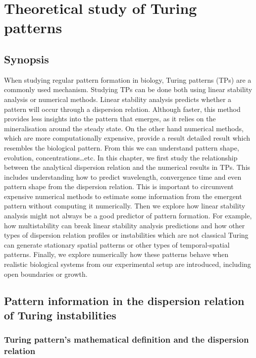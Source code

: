 \chapter{Theoretical study of Turing patterns }
\section{Synopsis}
When studying regular pattern formation in biology, Turing patterns (TPs) are a commonly used mechanism.
Studying TPs can be done both using linear stability analysis or numerical methods.
Linear stability analysis predicts whether a pattern will occur through a dispersion relation.
Although faster, this method provides less insights into the pattern that emerges, as it relies on the mineralisation around the steady state.
On the other hand numerical methods, which are more computationally expensive, provide a result detailed result which resembles the biological pattern. From this we can understand pattern shape, evolution, concentrations\ldots etc.
In this chapter, we first study the relationship between the analytical dispersion relation and the numerical results in TPs.
This includes understanding how to predict wavelength,
convergence time and even pattern shape from the dispersion relation.
This is important to circumvent expensive numerical methods to estimate some information from the emergent pattern without computing it numerically.
Then we explore how linear stability analysis might not always be a good predictor of pattern formation.
For example, how multistability can break linear stability analysis predictions and how other types of dispersion relation profiles or instabilities which are not classical Turing can generate stationary spatial patterns or other types of temporal-spatial patterns.
Finally, we explore numerically how these patterns behave when realistic biological systems from our experimental setup are introduced, including open boundaries or growth.



\section{Pattern information in the dispersion relation of Turing instabilities}
\subsection{Turing pattern's mathematical definition and the dispersion relation}


